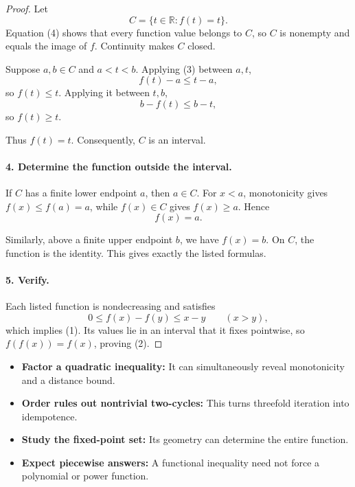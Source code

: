 \begin{dlsummary}[title={\bfseries Solution 57. The Hidden Interval},breakable]
\begin{proof}
Let
\[
C=\{t\in\mathbb R:f(t)=t\}.
\]
Equation (4) shows that every function value belongs to \(C\), so \(C\) is nonempty and equals the image of \(f\). Continuity makes \(C\) closed.

Suppose \(a,b\in C\) and \(a<t<b\). Applying (3) between \(a,t\),
\[
f(t)-a\le t-a,
\]
so \(f(t)\le t\). Applying it between \(t,b\),
\[
b-f(t)\le b-t,
\]
so \(f(t)\ge t\).

Thus \(f(t)=t\). Consequently, \(C\) is an interval.

\paragraph{4. Determine the function outside the interval.}

If \(C\) has a finite lower endpoint \(a\), then \(a\in C\). For \(x<a\), monotonicity gives \(f(x)\le f(a)=a\), while \(f(x)\in C\) gives \(f(x)\ge a\). Hence
\[
f(x)=a.
\]

Similarly, above a finite upper endpoint \(b\), we have \(f(x)=b\). On \(C\), the function is the identity. This gives exactly the listed formulas.

\paragraph{5. Verify.}

Each listed function is nondecreasing and satisfies
\[
0\le f(x)-f(y)\le x-y\qquad(x>y),
\]
which implies (1). Its values lie in an interval that it fixes pointwise, so \(f(f(x))=f(x)\), proving (2).
\end{proof}
\end{dlsummary}

\begin{takeaways}
\begin{itemize}
\item \textbf{Factor a quadratic inequality:} It can simultaneously reveal monotonicity and a distance bound.
\item \textbf{Order rules out nontrivial two-cycles:} This turns threefold iteration into idempotence.
\item \textbf{Study the fixed-point set:} Its geometry can determine the entire function.
\item \textbf{Expect piecewise answers:} A functional inequality need not force a polynomial or power function.
\end{itemize}
\end{takeaways}
